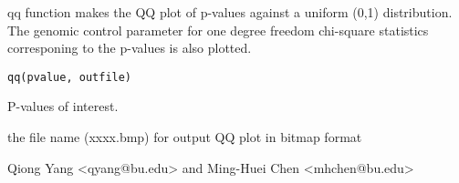 \begin{Description}\relax
qq function makes the QQ plot of p-values against a uniform (0,1) distribution. 
The genomic control parameter for one degree freedom chi-square statistics corresponing to the p-values is also 
plotted.
\end{Description}
\begin{Usage}
\begin{verbatim}
qq(pvalue, outfile)
\end{verbatim}
\end{Usage}
\begin{Arguments}
\begin{ldescription}
\item[\code{pvalue}] P-values of interest. 
\item[\code{outfile}] the file name (xxxx.bmp) for output QQ plot in bitmap format 
\end{ldescription}
\end{Arguments}
\begin{Author}\relax
Qiong Yang <qyang@bu.edu> and Ming-Huei Chen <mhchen@bu.edu>
\end{Author}

